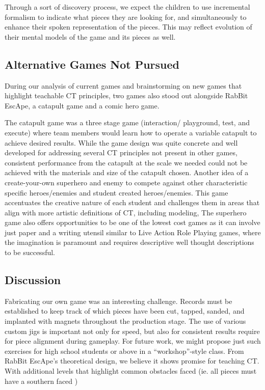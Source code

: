 \documentclass{acm_proc_article-sp}
\begin{document}
Through a sort of discovery process, we expect the children to use incremental formalism \cite{shipman1999formality} to indicate what pieces they are looking for, and simultaneously to enhance their spoken representation of the pieces. 
This may reflect evolution of their mental models of the game and its pieces as well. 

\subsection{Alternative Games Not Pursued}
\label{sec:terminated_games}
During our analysis of current games and brainstorming on new games that highlight teachable CT principles, two games also stood out alongside RabBit EscApe, a catapult game and a comic hero game.

The catapult game was a three stage game (interaction/ playground, test, and execute) where team members would learn how to operate a variable catapult to achieve desired results.
While the game design was quite concrete and well developed for addressing several CT principles not present in other games, consistent performance from the catapult at the scale we needed could not be achieved with the materials and size of the catapult chosen.
Another idea of a create-your-own superhero and enemy to compete against other characteristic specific heroes/enemies and student created heroes/enemies.
This game accentuates the creative nature of each student and challenges them in areas that align with more artistic definitions of CT, including modeling, 
The superhero game also offers opportunities to be one of the lowest cost games as it can involve just paper and a writing utensil similar to Live Action Role Playing games, where the imagination is paramount and requires descriptive well thought descriptions to be successful.

\subsection{Discussion}
\label{sec:discussion}
\sloppy Fabricating our own game was an interesting challenge.
Records must be established to keep track of which pieces have been cut, tapped, sanded, and implanted with magnets throughout the production stage.
The use of various custom jigs is important not only for speed, but also for consistent results require for piece alignment during gameplay.
For future work, we might propose just such exercises for high school students or above in a ``workshop''-style class.
From RabBit EscApe's theoretical design, we believe it shows promise for teaching CT. With additional levels that highlight common obstacles faced (ie. all pieces must have a southern faced )
\end{document}
